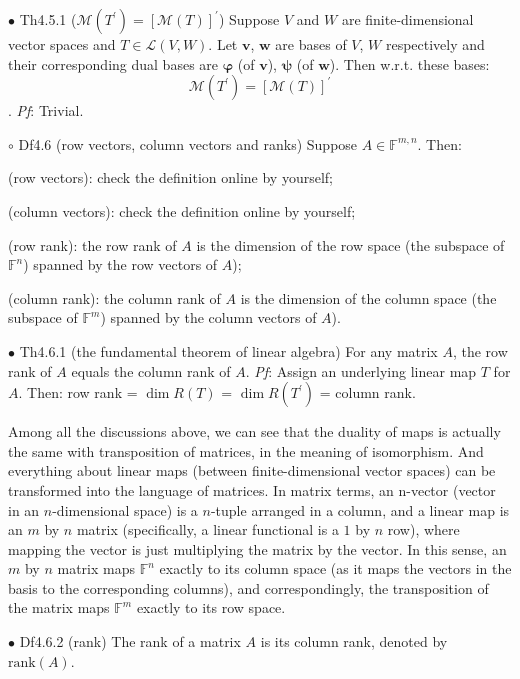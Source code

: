 \documentclass{article}
\begin{document}
\begin{Th}{$\bullet$ Th4.5.1 ($\mathcal{M}(T^\prime) = [\mathcal{M}(T)]^\prime$)}
    Suppose $V$ and $W$ are finite-dimensional vector spaces and $T\in\mathcal{L}(V, W)$. Let $\pmb{v}$, $\pmb{w}$ are bases of $V$, $W$ respectively and their corresponding dual bases are $\pmb{\varphi}$ (of $\pmb{v}$), $\pmb{\psi}$ (of $\pmb{w}$). Then w.r.t. these bases: 
    $$\mathcal{M}(T^\prime) = [\mathcal{M}(T)]^\prime$$.
    \tcblower
    \textit{Pf}: Trivial.
\end{Th}

\begin{Df}{$\circ$ Df4.6 (row vectors, column vectors and ranks)}
    Suppose $A\in\mathbb{F}^{m,n}$. Then:
    \begin{compactenum}
        \item (row vectors): check the definition online by yourself;
        \item (column vectors): check the definition online by yourself;
        \item (row rank): the row rank of $A$ is the dimension of the row space (the subspace of $\mathbb{F}^n$) spanned by the row vectors of $A$);
        \item (column rank): the column rank of $A$ is the dimension of the column space (the subspace of $\mathbb{F}^m$) spanned by the column vectors of $A$).
    \end{compactenum}
\end{Df}

\begin{Th}{$\bullet$ Th4.6.1 (the fundamental theorem of linear algebra)}
    For any matrix $A$, the row rank of $A$ equals the column rank of $A$.
    \tcblower
    \textit{Pf}: Assign an underlying linear map $T$ for $A$. Then: row rank = $\dim R(T)$ = $\dim R(T^\prime)$ = column rank.
\end{Th}

\begin{Rmk}{}
    Among all the discussions above, we can see that the duality of maps is actually the same with transposition of matrices, in the meaning of isomorphism. And everything about linear maps (between finite-dimensional vector spaces) can be transformed into the language of matrices. In matrix terms, an n-vector (vector in an $n$-dimensional space) is a $n$-tuple arranged in a column, and a linear map is an $m$ by $n$ matrix (specifically, a linear functional is a $1$ by $n$ row), where mapping the vector is just multiplying the matrix by the vector. In this sense, an $m$ by $n$ matrix maps $\mathbb{F}^n$ exactly to its column space (as it maps the vectors in the basis to the corresponding columns), and correspondingly, the transposition of the matrix maps $\mathbb{F}^m$ exactly to its row space.  
\end{Rmk}

\begin{Df}{$\bullet$ Df4.6.2 (rank)}
    The rank of a matrix $A$ is its column rank, denoted by $\text{rank}(A)$. 
\end{Df}
\end{document}
